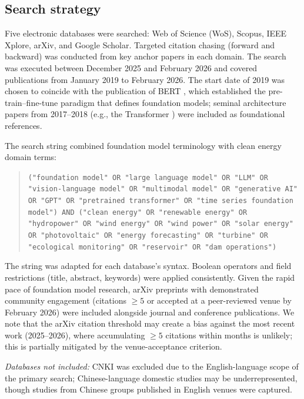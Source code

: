 \documentclass[preprint,12pt]{elsarticle}
\begin{document}
\subsection{Search strategy}
\label{subsec:search_strategy}

Five electronic databases were searched: Web of Science (WoS), Scopus, IEEE Xplore, arXiv, and Google Scholar. Targeted citation chasing (forward and backward) was conducted from key anchor papers in each domain. The search was executed between December 2025 and February 2026 and covered publications from January 2019 to February 2026. The start date of 2019 was chosen to coincide with the publication of BERT \cite{devlin2019bert}, which established the pre-train--fine-tune paradigm that defines foundation models; seminal architecture papers from 2017--2018 (e.g., the Transformer \cite{vaswani2017attention}) were included as foundational references.

The search string combined foundation model terminology with clean energy domain terms:

\begin{quote}\small\sloppy
\noindent\texttt{("foundation model" OR "large language model" OR "LLM" OR "vision-language model" OR "multimodal model" OR "generative AI" OR "GPT" OR "pretrained transformer" OR "time series foundation model") AND ("clean energy" OR "renewable energy" OR "hydropower" OR "wind energy" OR "wind power" OR "solar energy" OR "photovoltaic" OR "energy forecasting" OR "turbine" OR "ecological monitoring" OR "reservoir" OR "dam operations")}
\end{quote}

The string was adapted for each database's syntax. Boolean operators and field restrictions (title, abstract, keywords) were applied consistently. Given the rapid pace of foundation model research, arXiv preprints with demonstrated community engagement (citations $\geq 5$ or accepted at a peer-reviewed venue by February 2026) were included alongside journal and conference publications. We note that the arXiv citation threshold may create a bias against the most recent work (2025--2026), where accumulating $\geq 5$ citations within months is unlikely; this is partially mitigated by the venue-acceptance criterion.

\textit{Databases not included:} CNKI was excluded due to the English-language scope of the primary search; Chinese-language domestic studies may be underrepresented, though studies from Chinese groups published in English venues were captured.
\end{document}
